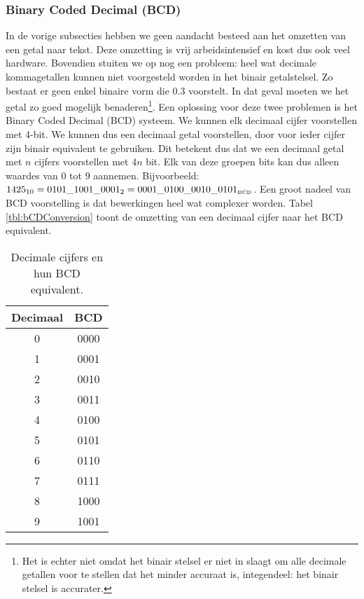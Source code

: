 \subsubsection{Binary Coded Decimal (BCD)}
\label{ss:bcd}
In de vorige subsecties hebben we geen aandacht besteed aan het omzetten van een getal naar tekst. Deze omzetting is vrij arbeidsintensief en kost dus ook veel hardware. Bovendien stuiten we op nog een probleem: heel wat decimale kommagetallen kunnen niet voorgesteld worden in het binair getalstelsel. Zo bestaat er geen enkel binaire vorm die $0.3$ voorstelt. In dat geval moeten we het getal zo goed mogelijk benaderen\footnote{Het is echter niet omdat het binair stelsel er niet in slaagt om alle decimale getallen voor te stellen dat het minder accuraat is, integendeel: het binair stelsel is accurater.}. Een oplossing voor deze twee problemen is het Binary Coded Decimal (BCD) systeem. We kunnen elk decimaal cijfer voorstellen met 4-bit. We kunnen dus een decimaal getal voorstellen, door voor ieder cijfer zijn binair equivalent te gebruiken. Dit betekent dus dat we een decimaal getal met $n$ cijfers voorstellen met $4n$ bit. Elk van deze groepen bits kan dus alleen waardes van $0$ tot $9$ aannemen. Bijvoorbeeld: $1425_{10}=0101\_1001\_0001_2=0001\_0100\_0010\_0101_{\mbox{\tiny{BCD}}}$. Een groot nadeel van BCD voorstelling is dat bewerkingen heel wat complexer worden. Tabel \ref{tbl:bCDConversion} toont de omzetting van een decimaal cijfer naar het BCD equivalent.
\begin{table}[hbt]
\centering
\begin{tabular}{c|c}
Decimaal&BCD\\\hline
0&0000\\
1&0001\\
2&0010\\
3&0011\\
4&0100\\
5&0101\\
6&0110\\
7&0111\\
8&1000\\
9&1001
\end{tabular}
\caption{Decimale cijfers en hun BCD equivalent.}
\end{table}
